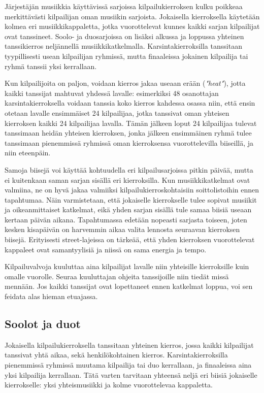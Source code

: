 \documentclass[12pt, a4paper, oneside]{article}
\begin{document}
Järjestäjän musiikkia käyttävissä sarjoissa kilpailukierroksen kulku poikkeaa merkittävästi kilpailijan oman musiikin sarjoista.
Jokaisella kierroksella käytetään kolmea eri musiikkikappaletta,
jotka vuorottelevat kunnes kaikki sarjan kilpailijat ovat tanssineet.
Soolo- ja duosarjoissa on lisäksi alkussa ja loppussa yhteinen tanssikierros neljännellä musiikkikatkelmalla.
Karsintakierroksilla tanssitaan tyypillisesti usean kilpailijan ryhmissä,
mutta finaaleissa jokainen kilpailija tai ryhmä tanssii yksi kerrallaan.

Kun kilpailijoita on paljon,
voidaan kierros jakaa useaan erään (\textit{"heat"}),
jotta kaikki tanssijat mahtuvat yhdessä lavalle: esimerkiksi 48 osanottajan karsintakierroksella voidaan tanssia koko kierros kahdessa osassa niin,
että ensin otetaan lavalle ensimmäiset 24 kilpailijaa,
jotka tanssivat oman yhteisen kierroksen kaikki 24 kilpailijaa lavalla.
Tämän jälkeen loput 24 kilpailijaa tulevat tanssimaan heidän yhteisen kierroksen,
jonka jälkeen ensimmäinen ryhmä tulee tanssimaan pienemmissä ryhmissä oman kierroksensa vuorottelevilla biiseillä,
ja niin eteenpäin.

Samoja biisejä voi käyttää kohtuudella eri kilpailusarjoissa pitkin päivää,
mutta ei kuitenkaan saman sarjan sisällä eri kierroksilla.
Kun musiikkikatkelmat ovat valmiina,
ne on hyvä jakaa valmiiksi kilpailukierroskohtaisiin soittolistoihin ennen tapahtumaa.
Näin varmistetaan,
että jokaiselle kierrokselle tulee sopivat musiikit ja oikeanmittaiset katkelmat,
eikä yhden sarjan sisällä tule samaa biisiä useaan kertaan päivän aikana.
Tapahtumassa edetään nopeasti sarjasta toiseen,
joten kesken kisapäivän on harvemmin aikaa valita lennosta seuraavan kierroksen biisejä.
Erityisesti street-lajeissa on tärkeää,
että yhden kierroksen vuorottelevat kappaleet ovat samantyylisiä ja niissä on sama energia ja tempo.

Kilpailuvalvoja kuuluttaa aina kilpailijat lavalle niin yhteisille kierroksille kuin omalle vuorolle.
Seuraa kuuluttajan ohjeita tanssijoille niin tiedät missä mennään.
Jos kaikki tanssijat ovat lopettaneet ennen katkelmat loppua,
voi sen feidata alas hieman etuajassa.

\subsection{Soolot ja duot} \label{subsec:soolot-ja-duot}

Jokaisella kilpailukierroksella tanssitaan yhteinen kierros,
jossa kaikki kilpailijat tanssivat yhtä aikaa,
sekä henkilökohtainen kierros.
Karsintakierroksilla pienemmissä ryhmissä muutama kilpailija tai duo kerrallaan,
ja finaaleissa aina yksi kilpailija kerrallaan.
Tätä varten tarvitaan yhteensä neljä eri biisiä jokaiselle kierrokselle:
yksi yhteismusiikki ja kolme vuorottelevaa kappaletta.
\end{document}
